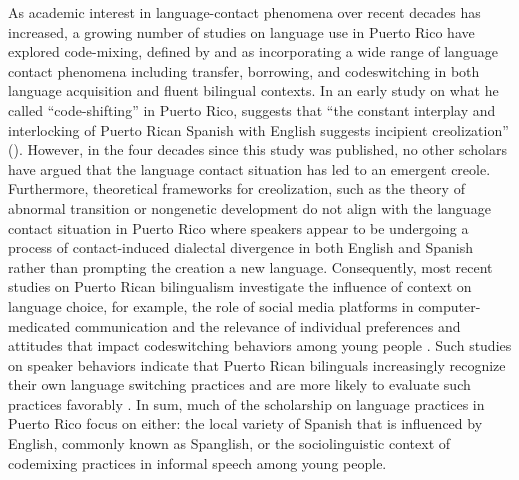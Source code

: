 \documentclass[output=paper,colorlinks,citecolor=brown]{langscibook}
\begin{document}
As academic interest in language-contact phenomena over recent decades has increased, a growing number of studies on language use in Puerto Rico have explored code-mixing, defined by \citet{Odlin_1989} and \citet{Muysken_2000} as incorporating a wide range of language contact phenomena including transfer, borrowing, and codeswitching in both language acquisition and fluent bilingual contexts. In an early study on what he called “code-shifting” in Puerto Rico, \citeauthor{Lawton_1979} suggests that “the constant interplay and interlocking of Puerto Rican Spanish with English suggests incipient creolization” (\citeyear[257]{Lawton_1979}). However, in the four decades since this study was published, no other scholars have argued that the language contact situation has led to an emergent creole. Furthermore, theoretical frameworks for creolization, such as the theory of abnormal transition or nongenetic development \citep[211]{Thomason_Kaufman_1988} do not align with the language contact situation in Puerto Rico where speakers appear to be undergoing a process of contact-induced dialectal divergence in both English and Spanish rather than prompting the creation a new language. Consequently, most recent studies on Puerto Rican bilingualism investigate the influence of context on language choice, for example, the role of social media platforms in computer-medicated communication \citep{Carroll_2008,Carroll_Mari_2017} and the relevance of individual preferences and attitudes that impact codeswitching behaviors among young people \citep{Tamargo_VelezAviles_2017,PerezCasas_2016}. Such studies on speaker behaviors indicate that Puerto Rican bilinguals increasingly recognize their own language switching practices and are more likely to evaluate such practices favorably \citep{GuzzardoTamargo_etal_2019}. In sum, much of the scholarship on language practices in Puerto Rico focus on either: the local variety of Spanish that is influenced by English, commonly known as Spanglish, or the sociolinguistic context of codemixing practices in informal speech among young people. 
\end{document}
